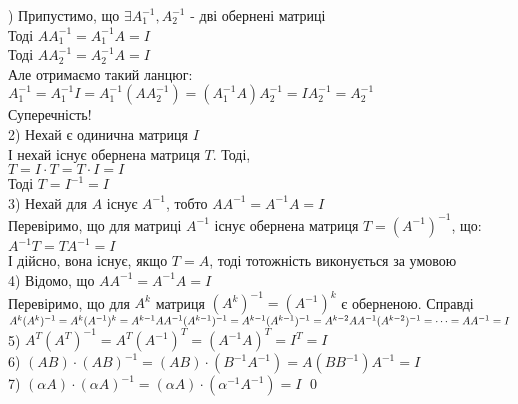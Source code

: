 \documentclass[a4paper, 10pt]{article}
\theoremstyle{theoremdd}
\begin{document}
	) Припустимо, що $\exists A^{-1}_1, A^{-1}_2$ - дві обернені матриці\\
	Тоді $AA^{-1}_1 = A_1^{-1}A = I$\\
	Тоді $AA^{-1}_2 = A_2^{-1}A = I$\\
	Але отримаємо такий ланцюг:\\
	$A^{-1}_1 = A^{-1}_1 I = A^{-1}_1 (A A^{-1}_2) = (A^{-1}_1 A) A^{-1}_2 = I A_2^{-1} = A_2^{-1}$\\
	Суперечність!
	\bigskip \\
	2) Нехай є одинична матриця $I$\\
	І нехай існує обернена матриця $T$. Тоді,\\
	$T = I \cdot T = T \cdot I = I$\\
	Тоді $T = I^{-1} = I$
	\bigskip \\
	3) Нехай для $A$ існує $A^{-1}$, тобто $AA^{-1} = A^{-1}A = I$\\
	Перевіримо, що для матриці $A^{-1}$ існує обернена матриця $T = (A^{-1})^{-1}$, що:\\
	$A^{-1} T = T A^{-1} = I$\\
	І дійсно, вона існує, якщо $T = A$, тоді тотожність виконується за умовою
	\bigskip \\
	4) Відомо, що $AA^{-1} = A^{-1}A = I$\\
	Перевіримо, що для $A^{k}$ матриця $(A^{k})^{-1} = (A^{-1})^k$ є оберненою. Справді\\
	$A^{k} (A^{k})^{-1} = A^{k} (A^{-1})^{k} = A^{k-1} A A^{-1} (A^{k-1})^{-1} = A^{k-1} (A^{k-1})^{-1} = A^{k-2} A A^{-1} (A^{k-2})^{-1} \\ = \dots = AA^{-1} = I$
	\bigskip \\
	5) $A^{T} (A^{T})^{-1} = A^{T} (A^{-1})^T = (A^{-1} A)^{T} = I^T = I$
	\bigskip \\
	6) $(AB) \cdot (AB)^{-1} = (AB) \cdot (B^{-1} A^{-1}) = A(B B^{-1})A^{-1} = I$
	\bigskip \\
	7) $(\alpha A) \cdot (\alpha A)^{-1} = (\alpha A) \cdot (\alpha^{-1} A^{-1}) = I$ \qed
	\bigskip \\
	
\end{document}

